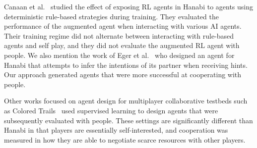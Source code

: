 \documentclass[letterpaper]{article} %
\begin{document}


Canaan et al.~ studied the effect of exposing RL agents in Hanabi  to agents using deterministic rule-based  strategies during  training.  They evaluated the performance of the augmented agent when interacting with various AI agents.
Their training regime did not alternate between  interacting with rule-based agents and self play, and they did not evaluate the augmented RL agent with people.
 We also mention the work of Eger et al.~ who designed an agent
 for Hanabi that attempts to infer the intentions of its partner when receiving hints. Our approach generated agents that were more successful at cooperating with people.

Other works focused on agent design for multiplayer collaborative testbeds
such as Colored Trails~\cite{GAL20101460}  used supervised learning to design agents  that were subsequently
evaluated with people. These settings are significantly different than Hanabi in that players are
essentially self-interested, and cooperation was measured in how they are able to negotiate scarce resources with other players.
\end{document}
